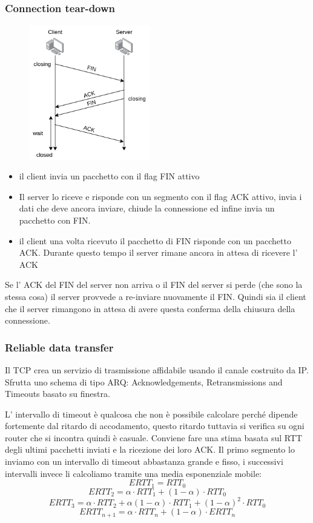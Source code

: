 \subsubsection{Connection tear-down}
\begin{figure}[H]
    \centering
    \includegraphics[width=200px]{images/6_Trasporto/connection_teardown.png}
\end{figure}

\begin{itemize}
    \item il client invia un pacchetto con il flag FIN attivo
    \item Il server lo riceve e risponde con un segmento con il flag ACK attivo, invia i dati che deve ancora inviare, chiude la connessione ed infine invia un pacchetto con FIN.
    \item il client una volta ricevuto il pacchetto di FIN risponde con un pacchetto ACK.
    Durante questo tempo il server rimane ancora in attesa di ricevere l' ACK
\end{itemize}
Se l' ACK del FIN del server non arriva o il FIN del server si perde (che sono la stessa cosa) il server provvede a re-inviare nuovamente il FIN.
Quindi sia il client che il server rimangono in attesa di avere questa conferma della chiusura della connessione.

\subsubsection{Reliable data transfer}
Il TCP crea un servizio di trasmissione affidabile usando il canale costruito da IP.
Sfrutta uno schema di tipo ARQ: Acknowledgements, Retransmissions and Timeouts basato su finestra.

L' intervallo di timeout è qualcosa che non è possibile calcolare perché dipende fortemente dal ritardo di accodamento, questo ritardo tuttavia si verifica su ogni router che si incontra quindi è casuale.
Conviene fare una stima basata sul RTT degli ultimi pacchetti inviati e la ricezione dei loro ACK.
Il primo segmento lo inviamo con un intervallo di timeout abbastanza grande e fisso, i successivi intervalli invece li calcoliamo tramite una media esponenziale mobile:
$$ ERTT_1 = RTT_0 $$
$$ ERTT_2 = \alpha \cdot RTT_1 + (1-\alpha) \cdot RTT_0 $$
$$ ERTT_3 = \alpha \cdot RTT_2 + \alpha(1-\alpha) \cdot RTT_1 + (1 - \alpha)^2 \cdot RTT_0 $$
$$ ERTT_{n+1} = \alpha \cdot RTT_n + (1 - \alpha) \cdot ERTT_n $$

